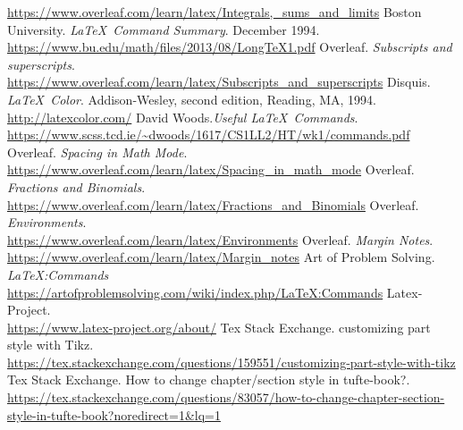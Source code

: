 \documentclass[12pt,hidelinks]{article}
\renewcommand{\thesection}{\arabic{section}}
\begin{document}
\begin{thebibliography}{17}
			\url{https://www.overleaf.com/learn/latex/Integrals,_sums_and_limits}
		 Boston University. \textit{\LaTeX\ Command Summary}. December 1994.\\
			\url{https://www.bu.edu/math/files/2013/08/LongTeX1.pdf}
		 Overleaf. \textit{Subscripts and superscripts}.\\
			\url{https://www.overleaf.com/learn/latex/Subscripts_and_superscripts}
		 Disquis. \textit{\LaTeX\ Color}. Addison-Wesley, second edition, Reading, MA, 1994.\\
				\url{http://latexcolor.com/}
		 David Woods.\textit{Useful \LaTeX\ Commands}.\\
				\url{https://www.scss.tcd.ie/~dwoods/1617/CS1LL2/HT/wk1/commands.pdf}
		 Overleaf. \textit{Spacing in Math Mode}.\\
				\url{https://www.overleaf.com/learn/latex/Spacing_in_math_mode}
		 Overleaf. \textit{Fractions and Binomials}.\\
				\url{https://www.overleaf.com/learn/latex/Fractions_and_Binomials}
		 Overleaf. \textit{Environments}.\\
				\url{https://www.overleaf.com/learn/latex/Environments}
		 Overleaf. \textit{Margin Notes}.\\
				\url{https://www.overleaf.com/learn/latex/Margin_notes}
		 Art of Problem Solving. \textit{LaTeX:Commands}\\
				\url{https://artofproblemsolving.com/wiki/index.php/LaTeX:Commands}
		 Latex-Project.\\
				\url{https://www.latex-project.org/about/}
		 Tex Stack Exchange. customizing part style with Tikz.\\
				\url{https://tex.stackexchange.com/questions/159551/customizing-part-style-with-tikz}
			Tex Stack Exchange. How to change chapter/section style in tufte-book?.\\
				\url{https://tex.stackexchange.com/questions/83057/how-to-change-chapter-section-style-in-tufte-book?noredirect=1&lq=1}
	\end{thebibliography}
\addtocounter{section}{14}
\addcontentsline{toc}{section}{\protect\numberline{\thesection}~~~ References}
\end{document}
